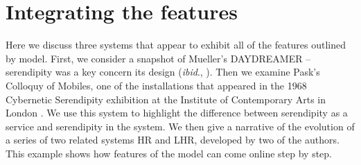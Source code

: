 \section{Integrating the features}\label{sec:system-analysis}

Here we discuss three systems that appear to exhibit all of the features outlined by model.  First, we consider a snapshot of Mueller's {\sf DAYDREAMER} \cite{mueller1990} -- serendipity was a key concern its design (\emph{ibid}., ).  Then we examine Pask's {\sf Colloquy of Mobiles}, one of the installations that appeared in the 1968 Cybernetic Serendipity exhibition at the Institute of Contemporary Arts in London
\cite{reichardt1969cybernetic}.  We use this system to highlight the difference between serendipity as a service and serendipity in the system.  We then give a narrative of the evolution of a series of two related systems {\sf HR} and {\sf LHR}, developed by two of the authors.  This example shows how features of the model can come online step by step.

